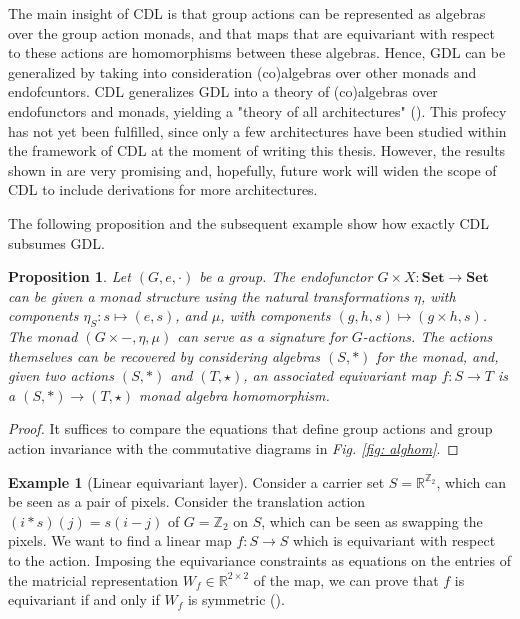 \documentclass[11pt,a4paper,openright,twoside]{report}
\newcounter{mycounter}
\theoremstyle{plain}
\newtheorem{proposition}[mycounter]{Proposition}
\theoremstyle{definition}
\newtheorem{example}[mycounter]{Example}
\begin{document}
The main insight of CDL is that group actions can be represented as algebras over the group action monads, and that maps that are equivariant with respect to these actions are homomorphisms between these algebras. Hence, GDL can be generalized by taking into consideration (co)algebras over other monads and endofcuntors. CDL generalizes GDL into a theory of (co)algebras over endofunctors and monads, yielding a "theory of all architectures" (\cite{gavranovicposition}). This profecy has not yet been fulfilled, since only a few architectures have been studied within the framework of CDL at the moment of writing this thesis. However, the results shown in \cite{gavranovicposition} are very promising and, hopefully, future work will widen the scope of CDL to include derivations for more architectures.

The following proposition and the subsequent example show how exactly CDL subsumes GDL.

\begin{proposition}
  Let $(G,e,\cdot)$ be a group. The endofunctor $G \times X: \mathbf{Set} \to \mathbf{Set}$ can be given a monad structure using the natural transformations $\eta$, with components $\eta_S: s \mapsto (e,s)$, and $\mu$, with components $(g,h,s) \mapsto (g \times h, s)$. 
  The monad $(G \times -, \eta, \mu)$ can serve as a signature for $G$-actions. The actions themselves can be recovered by considering algebras $(S,\ast)$ for the monad, and, given two actions $(S,\ast)$ and $(T,\star)$, an associated equivariant map $f: S \to T$ is a $(S,\ast) \to (T,\star)$ monad algebra homomorphism.
\end{proposition}
\begin{proof}
  It suffices to compare the equations that define group actions and group action invariance with the commutative diagrams in \textit{Fig. \ref{fig: alghom}}.
\end{proof}

\begin{example}[Linear equivariant layer]
  \label{ex: translationaction}
  Consider a carrier set $S = \mathbb{R}^{\mathbb{Z}_2}$, which can be seen as a pair of pixels. Consider the translation action $(i \ast s)(j) = s(i-j)$ of $G = \mathbb{Z}_2$ on $S$, which can be seen as swapping the pixels.
  We want to find a linear map $f: S \to S$ which is equivariant with respect to the action. Imposing the equivariance constraints as equations on the entries of the matricial representation $W_f \in \mathbb{R}^{2 \times 2}$ of the map, we can prove that $f$ is equivariant if and only if $W_f$ is symmetric (\cite{gavranovicposition}).
\end{example}
\end{document}
